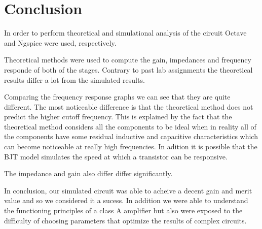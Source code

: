 
\section{Conclusion}
\label{sec:conclusion}



In order to perform theoretical and simulational analysis of the circuit Octave and Ngspice were used, respectively.


Theoretical methods were used to compute the gain, impedances and frequency responde of both of the stages. Contrary to past lab assignments the theoretical results differ a lot from the simulated results.

Comparing the frequency response graphs we can see that they are quite different. The most noticeable difference is that the theoretical method does not predict the higher cutoff frequency. This is explained by the fact that the theoretical method considers all the components to be ideal when in reality all of the components have some residual inductive and capacitive characteristics which can become noticeable at really high frequencies. In adition it is possible that the BJT model simulates the speed at which a transistor can be responsive.

The impedance and gain also differ differ significantly.

In conclusion, our simulated circuit was able to acheive a decent gain and merit value and so we considered it a sucess. In addition we were able to understand the functioning principles of a class A amplifier but also were exposed to the difficulty of choosing parameters that optimize the results of complex circuits.
